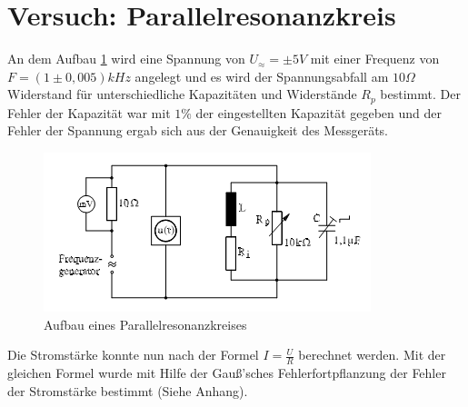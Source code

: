 \section{Versuch: Parallelresonanzkreis}
An dem Aufbau \ref{fig:aufbauparallel} wird eine Spannung von $U_\approx=\pm 5V$ mit einer Frequenz von $F=(1 \pm 0,005) kHz$ angelegt und es wird der Spannungsabfall am $10\Omega$ Widerstand für unterschiedliche Kapazitäten und Widerstände $R_p$ bestimmt. Der Fehler der Kapazität war mit $1\% $ der eingestellten Kapazität gegeben und der Fehler der Spannung ergab sich aus der Genauigkeit des Messgeräts.
\begin{figure}[h]
  \centering
  \includegraphics[width=.9\textwidth]{Bauplanparall.png}
  \caption{Aufbau eines Parallelresonanzkreises}
  \label{fig:aufbauparallel}
\end{figure}
 Die Stromstärke konnte nun nach der Formel $I=\frac{U}{R}$ berechnet werden. Mit der gleichen Formel wurde mit Hilfe der Gauß'sches Fehlerfortpflanzung der Fehler der Stromstärke bestimmt (Siehe Anhang).
